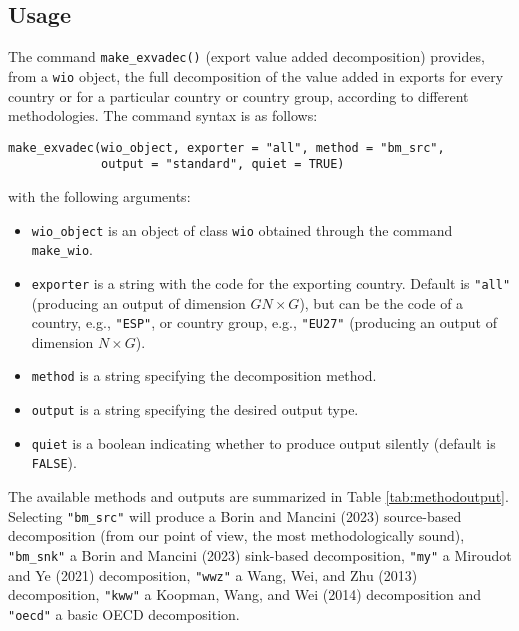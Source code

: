 \hypertarget{usage-1}{%
\subsection{Usage}\label{usage-1}}

The command \texttt{make\_exvadec()} (export value added decomposition) provides, from a
\texttt{wio} object, the full decomposition of the value added in exports for every
country or for a particular country or country group, according to different
methodologies. The command syntax is as follows:

\begin{verbatim}
make_exvadec(wio_object, exporter = "all", method = "bm_src",
             output = "standard", quiet = TRUE)
\end{verbatim}

with the following arguments:

\begin{itemize}
\tightlist
\item
  \texttt{wio\_object} is an object of class \texttt{wio} obtained through the
  command \texttt{make\_wio}.
\item
  \texttt{exporter} is a string with the code for the exporting country.
  Default is \texttt{"all"} (producing an output of dimension \(GN \times G\)), but
  can be the code of a country, e.g., \texttt{"ESP"}, or country group, e.g.,
  \texttt{"EU27"} (producing an output of dimension \(N \times G\)).
\item
  \texttt{method} is a string specifying the decomposition method.
\item
  \texttt{output} is a string specifying the desired output type.
\item
  \texttt{quiet} is a boolean indicating whether to produce output silently (default is
  \texttt{FALSE}).
\end{itemize}

The available methods and outputs are summarized in Table
\ref{tab:methodoutput}. Selecting \texttt{"bm\_src"} will produce a
Borin and Mancini (2023) source-based decomposition (from our point of view,
the most methodologically sound), \texttt{"bm\_snk"} a Borin and Mancini (2023) sink-based
decomposition, \texttt{"my"} a Miroudot and Ye (2021) decomposition, \texttt{"wwz"} a
Wang, Wei, and Zhu (2013) decomposition, \texttt{"kww"} a Koopman, Wang, and Wei (2014)
decomposition and \texttt{"oecd"} a basic OECD decomposition.

